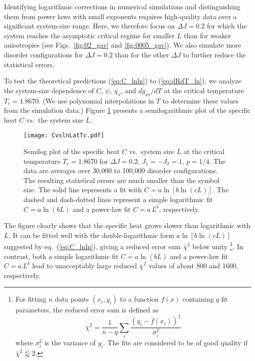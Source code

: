 \documentclass[twocolumn,showpacs,superscriptaddress,aps,prb]{revtex4-2}
\begin{document}
Identifying logarithmic corrections in numerical simulations and distinguishing them
from power laws with small exponents requires high-quality data over a significant system-size
range. Here, we therefore focus on $\Delta J = 0.2$ for which the system reaches
the asymptotic critical regime for smaller $L$ than for weaker anisotropies (see Figs.\
\ref{fig:02_gav} and \ref{fig:0005_gav}). We also simulate more disorder configurations
for $\Delta J =0.2$ than for the other $\Delta J$ to further reduce the statistical errors.

To test the theoretical predictions (\ref{eq:C_lnln}) to (\ref{eq:dRdT_ln}), we analyze
the system-size dependence of $C$, $\psi$, $\chi_s$, and $dg_\mathrm{av}/dT$ at the
critical temperature $T_c=1.8670$. (We use polynomial interpolations in $T$ to determine
these values from the simulation data.) Figure \ref{fig:Cv} presents a semilogarithmic plot
of the specific heat $C$ vs.\ the system size $L$.
\begin{figure}
\texttt{[image: CvslnLatTc.pdf]}
\caption{Semilog plot of the specific heat $C$ vs.\ system size $L$ at the critical temperature $T_c=1.8670$ for
$\Delta J =0.2$, $J_1=-J_2=1$, $p=1/4$. The data are averages over 30,000 to 100,000 disorder
configurations. The resulting statistical errors are much smaller than the symbol size.
The solid line represents a fit with $C=a \ln[b \ln(cL)]$. The dashed and
dash-dotted lines represent a simple logarithmic fit $C=a \ln(bL)$ and a power-law fit
$C=a\, L^b$, respectively.}
\label{fig:Cv}
\end{figure}
The figure clearly shows that the specific heat grows slower than logarithmic with $L$. It can be fitted well with
the double-logarithmic form $a \ln[b \ln(cL)]$ suggested by eq.\ (\ref{eq:C_lnln}), giving a reduced error sum $\bar \chi^2$
below unity \footnote{ For fitting $n$ data points $(x_i,y_i)$ to a function $f(x)$ containing $q$ fit parameters, the reduced error
sum is defined as
\begin{equation}
\bar \chi^2 = \frac 1 {n-q} \sum_i \frac{(y_i - f(x_i))^2}{\sigma_i^2}
\end{equation}
where $\sigma_i^2$ is the variance of $y_i$. The fits are considered to be of good quality if $\bar \chi^2 \lessapprox 2$.}.
%
In contrast, both a simple logarithmic fit $C=a\ln(bL)$ and a power-law fit $C=a\, L^b$ lead to unacceptably large
reduced $\bar \chi^2$ values of about 800 and 1600, respectively.
\end{document}
